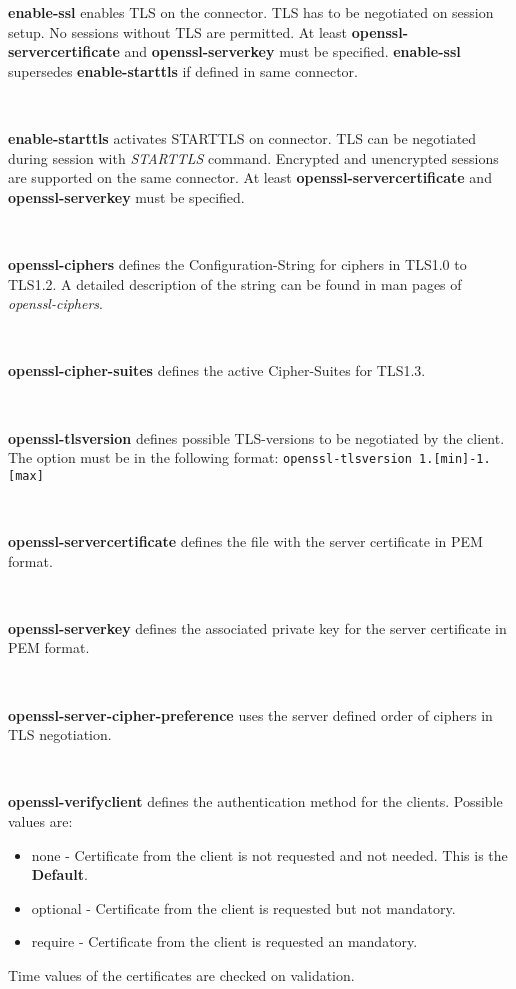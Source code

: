 \textbf{enable-ssl} enables TLS on the connector.
TLS has to be negotiated on session setup.
No sessions without TLS are permitted.
At least \textbf{openssl-servercertificate} and \textbf{openssl-serverkey} must be specified.
\textbf{enable-ssl} supersedes \textbf{enable-starttls} if defined in same connector.

~

\textbf{enable-starttls} activates STARTTLS on connector.
TLS can be negotiated during session with \textit{STARTTLS} command. 
Encrypted and unencrypted sessions are supported on the same connector.
At least \textbf{openssl-servercertificate} and \textbf{openssl-serverkey} must be specified.

~

\textbf{openssl-ciphers} defines the Configuration-String for ciphers in TLS1.0 to TLS1.2.
A detailed description of the string can be found in man pages of \textit{openssl-ciphers}.

~

\textbf{openssl-cipher-suites} defines the active Cipher-Suites for TLS1.3.

~

\textbf{openssl-tlsversion} defines possible TLS-versions to be negotiated by the client.
The option must be in the following format: \texttt{openssl-tlsversion 1.[min]-1.[max]}

~

\textbf{openssl-servercertificate} defines the file with the server certificate in PEM format.

~

\textbf{openssl-serverkey} defines the associated private key for the server certificate in PEM format.

~

\textbf{openssl-server-cipher-preference} uses the server defined order of ciphers in TLS negotiation.

~

\textbf{openssl-verifyclient} defines the authentication method for the clients.
Possible values are:
\begin{itemize}
	\item{none} - Certificate from the client is not requested and not needed. This is the \textbf{Default}.
	\item{optional} - Certificate from the client is requested but not mandatory.
	\item{require} - Certificate from the client is requested an mandatory.
\end{itemize}
Time values of the certificates are checked on validation.


